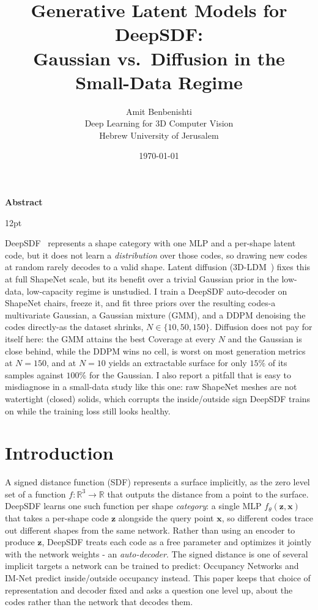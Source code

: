\documentclass[11pt]{article}
\title{Generative Latent Models for DeepSDF:\\
Gaussian vs.\ Diffusion in the Small-Data Regime}
\author{Amit Benbenishti \\
  Deep Learning for 3D Computer Vision \\
  Hebrew University of Jerusalem}
\date{\today}
\makeatletter
\renewenvironment{abstract}%
    {\vspace{-0.15cm}\centerline{\large\bf Abstract}%
     \begin{list}{}%
        {\setlength{\rightmargin}{0.1cm}%
         \setlength{\leftmargin}{0.1cm}}%
      \item[]\ignorespaces%
      \@setsize\normalsize{12pt}\xpt\@xpt
      }%
    {\unskip\end{list}}
\makeatother
\begin{document}
\maketitle

\begin{abstract}
DeepSDF~\citep{park2019deepsdf} represents a shape category with one MLP and a
per-shape latent code, but it does not learn a \emph{distribution} over those
codes, so drawing new codes at random rarely decodes to a valid shape. Latent
diffusion (3D-LDM~\citep{nam2022lion3dldm}) fixes this at full ShapeNet scale,
but its benefit over a trivial Gaussian prior in the low-data, low-capacity
regime is unstudied. I train a DeepSDF auto-decoder on ShapeNet chairs, freeze
it, and fit three priors over the resulting codes-a multivariate Gaussian, a
Gaussian mixture (GMM), and a DDPM denoising the codes directly-as the dataset
shrinks, $N \in \{10,50,150\}$. Diffusion does not pay for itself here: the GMM
attains the best Coverage at every $N$ and the Gaussian is close behind, while
the DDPM wins no cell, is worst on most generation metrics at $N=150$, and at
$N=10$ yields an extractable surface for only $15\%$ of its samples against
$100\%$ for the Gaussian. I also report a pitfall that is easy to misdiagnose
in a small-data study like this one: raw ShapeNet meshes are not watertight
(closed) solids, which corrupts the inside/outside sign DeepSDF trains on
while the training loss still looks healthy.
\end{abstract}

\section{Introduction}

A signed distance function (SDF) represents a surface implicitly, as the zero
level set of a function $f:\mathbb{R}^3 \to \mathbb{R}$ that outputs the distance
from a point to the surface. DeepSDF \citep{park2019deepsdf} learns one such
function per shape \emph{category}: a single MLP $f_\theta(\mathbf{z},
\mathbf{x})$ that takes a per-shape code $\mathbf{z}$ alongside the query point
$\mathbf{x}$, so different codes trace out different shapes from the same
network. Rather than using an encoder to produce $\mathbf{z}$, DeepSDF treats
each code as a free parameter and optimizes it jointly with the network weights
- an \emph{auto-decoder}. The signed distance is one of several implicit
targets a network can be trained to predict: Occupancy Networks
\citep{mescheder2019occnet} and IM-Net \citep{chen2019imnet} predict
inside/outside occupancy instead. This paper keeps that choice of
representation and decoder fixed and asks a question one level up, about the
codes rather than the network that decodes them.
\end{document}
